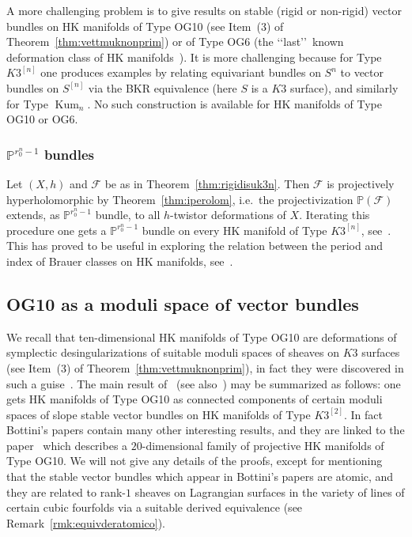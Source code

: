 \documentclass[11pt]{amsart}
\newcommand{\PP}{{\mathbb P}}
\let\mathcal\mathscr
\def\cF{\mathcal{F}}
\DeclareMathOperator{\Kum}{Kum}
\theoremstyle{definition}
\theoremstyle{remark}
\begin{document}
A more challenging problem is to give results on  stable (rigid or non-rigid) vector bundles on HK manifolds of Type OG10 (see Item~(3) of Theorem~\ref{thm:vettmuknonprim}) or of Type OG6 (the \lq\lq last\rq\rq\  known deformation class of HK manifolds~\cite{og:voilaog6}). It is more challenging because for Type $K3^{[n]}$ one produces examples by relating equivariant bundles on $S^n$ to vector bundles on $S^{[n]}$ via the BKR equivalence (here $S$ is a $K3$ surface), and similarly 
for Type $\Kum_n$.  No such construction is available for HK manifolds of Type OG10 or OG6.


%
\subsubsection{  $\PP^{r_0^n-1}$ bundles}
%
Let $(X,h)$ and $\cF$ be as in Theorem~\ref{thm:rigidisuk3n}. Then $\cF$ is projectively hyperholomorphic by Theorem~\ref{thm:iperolom}, 
i.e.~the projectivization $\PP(\cF)$ extends, as $\PP^{r_0^n-1}$ bundle, to all $h$-twistor deformations of $X$. Iterating this procedure one 
gets a $\PP^{r_0^n-1}$ bundle on every HK manifold of Type $K3^{[n]}$, see~\cite[Thm.~1.4]{markman:rank1obs}. This has proved to be useful in exploring the relation between the period and index of Brauer classes on HK manifolds, see~\cite{bottinidh:period-index-hk}.

%
\subsection{OG10 as a moduli space of vector bundles}
%
%
\setcounter{equation}{0}
%
We  recall that  ten-dimensional HK manifolds of Type OG10 are deformations of symplectic desingularizations of suitable moduli spaces of sheaves on $K3$ surfaces (see Item~(3) of Theorem~\ref{thm:vettmuknonprim}), in fact they were discovered in such a guise~\cite{og:voilaog10}.  The main result of~\cite{bottini:og10asmodspace} (see also~\cite{bottini:towardsog10}) may be summarized as follows: one gets HK manifolds of Type OG10 as connected components of certain moduli spaces of slope stable vector bundles on HK manifolds  of Type $K3^{[2]}$. In fact Bottini's papers contain many other interesting results, and they are linked to the paper~\cite{lsv:og10ascompcftdjac} which describes a $20$-dimensional family of projective HK manifolds of Type OG10. We will not give any details of the proofs, except for mentioning that the stable vector bundles which appear in Bottini's papers are atomic, and they are related to rank-$1$ sheaves on Lagrangian surfaces in the variety of lines of certain cubic fourfolds via a suitable derived equivalence 
(see Remark~\ref{rmk:equivderatomico}).
%
\end{document}
